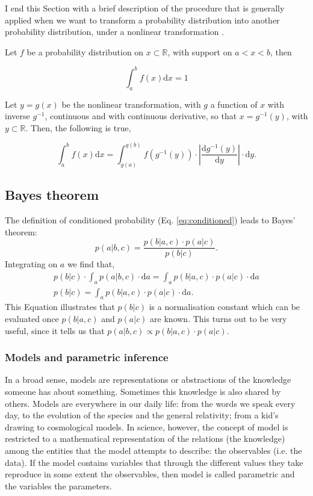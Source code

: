 {\color{red}
I end this Section with a brief description of the procedure that is generally applied when we want to transform a probability distribution into another probability distribution, under a nonlinear transformation \cite[for more details see page 18 and 19 of][]{Bishop2006}. 

Let  $f$ be a probability distribution on $x\subset\mathbb{R}$, with support on $a<x<b$, then

\begin{equation}
\int_a^b f(x) \mathrm{d}x = 1 \nonumber
\end{equation}

Let $y=g(x)$ be the nonlinear transformation, with $g$ a function of $x$ with inverse $g^{-1}$, continuous and with continuous derivative, so that $x=g^{-1}(y)$, with $y\subset \mathbb{R}$. Then, the following is true,

\begin{equation}
\label{eq:transformdistribution}
\int_a^b f(x) \mathrm{d}x = \int_{g(a)}^{g(b)} f(g^{-1}(y))\cdot \left|\frac{\mathrm{d}g^{-1}(y)}{\mathrm{d}y}\right|\cdot \mathrm{d}y.
\end{equation}
}
\subsection{Bayes theorem}
The definition of conditioned probability (Eq. \ref{eq:conditioned}) leads to Bayes' theorem:
\begin{equation}
p(a|b,c) = \frac{p(b|a,c)\cdot p(a|c)}{p(b|c)}.
\end{equation}
Integrating on $a$ we find that,
\begin{align}
\label{eq:evidence}
p(b|c) \cdot \int_a p(a|b,c)\cdot \mathrm{d}a = \int_a p(b|a,c) \cdot p(a|c) \cdot \mathrm{d}a \nonumber \\
p(b|c) = \int_a p(b|a,c) \cdot p(a|c) \cdot \mathrm{d}a.
\end{align}
This Equation illustrates that $p(b|c)$ is a normalisation constant which can be evaluated once $p(b|a,c)$ and $p(a|c)$ are known. This turns out to be very useful, since it tells us that $p(a|b,c) \propto p(b|a,c) \cdot p(a|c)$.

\subsubsection{Models and parametric inference}
\label{sect:parametric_inference}
In a broad sense, models are representations or abstractions of the knowledge someone has about something. Sometimes this knowledge is also shared by others. Models are everywhere in our daily life: from the words we speak every day, to the evolution of the species and the general relativity; from a kid's drawing to cosmological models. In science, however, the concept of model is restricted to a mathematical representation of the relations (the knowledge) among the entities that the model attempts to describe: the observables (i.e. the data). If the model contains variables that through the different values they take reproduce in some extent the observables, then model is called parametric and the variables the parameters. 

